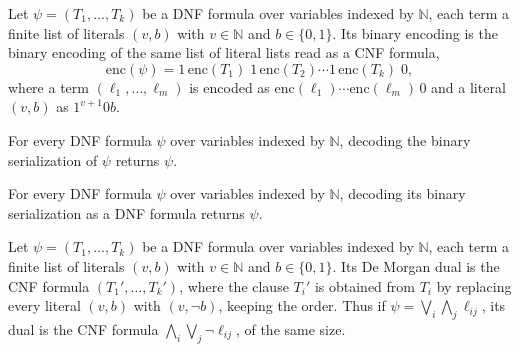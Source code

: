 \begin{definition}
\label{Std.Sat.DNF.serialize}
\leanok
{}
Let $\psi = (T_1, \dots, T_k)$ be a DNF formula over variables indexed by $\mathbb{N}$,
each term a finite list of literals $(v,b)$ with $v \in \mathbb{N}$ and $b \in \{0,1\}$.
Its binary encoding is the binary encoding of the same list of literal lists read as a CNF
formula,
\[
  \mathrm{enc}(\psi) = 1\,\mathrm{enc}(T_1)\;1\,\mathrm{enc}(T_2) \cdots 1\,\mathrm{enc}(T_k)\;0,
\]
where a term $(\ell_1, \dots, \ell_m)$ is encoded as
$\mathrm{enc}(\ell_1)\cdots\mathrm{enc}(\ell_m)\,0$ and a literal $(v,b)$ as $1^{v+1}0b$.
\end{definition}

\begin{theorem}
\label{Std.Sat.DNF.decode_serialize}
\leanok
{}
For every DNF formula $\psi$ over variables indexed by $\mathbb{N}$, decoding the binary
serialization of $\psi$ returns $\psi$.
\end{theorem}

\begin{theorem}
\label{Std.Sat.DNF.decode_cnf_serialize}
\leanok
{}
For every DNF formula $\psi$ over variables indexed by $\mathbb{N}$, decoding its binary
serialization as a DNF formula returns $\psi$.
\end{theorem}

\begin{definition}
\label{Std.Sat.DNF.dual}
\leanok
{}
Let $\psi = (T_1, \dots, T_k)$ be a DNF formula over variables indexed by $\mathbb{N}$,
each term a finite list of literals $(v,b)$ with $v \in \mathbb{N}$ and $b \in \{0,1\}$.
Its De Morgan dual is the CNF formula $(T_1', \dots, T_k')$, where the clause $T_i'$ is
obtained from $T_i$ by replacing every literal $(v,b)$ with $(v, \neg b)$, keeping the
order. Thus if $\psi = \bigvee_i \bigwedge_j \ell_{ij}$, its dual is the CNF formula
$\bigwedge_i \bigvee_j \neg\ell_{ij}$, of the same size.
\end{definition}

